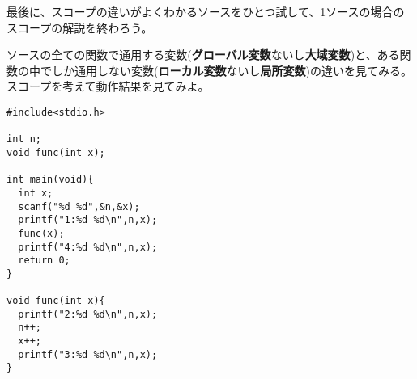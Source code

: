最後に、スコープの違いがよくわかるソースをひとつ試して、1ソースの場合のスコープの解説を終わろう。
\begin{boxnote}
\begin{multicols}{2}
ソースの全ての関数で通用する変数(\textbf{グローバル変数}ないし\textbf{大域変数})と、ある関数の中でしか通用しない変数(\textbf{ローカル変数}ないし\textbf{局所変数})の違いを見てみる。スコープを考えて動作結果を見てみよ。
\begin{lstlisting}[caption=変数のスコープの違い,label=program6_2]
#include<stdio.h>

int n;
void func(int x);

int main(void){
  int x;
  scanf("%d %d",&n,&x);
  printf("1:%d %d\n",n,x);
  func(x);
  printf("4:%d %d\n",n,x);
  return 0;
}

void func(int x){
  printf("2:%d %d\n",n,x);
  n++;
  x++;
  printf("3:%d %d\n",n,x);
}
\end{lstlisting}
\end{multicols}
\end{boxnote}

